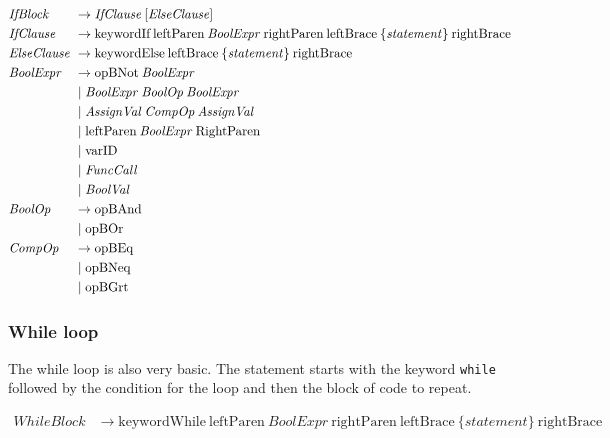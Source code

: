 \begin{align*}
    \omit $\mathit{IfBlock}$ \hfil &\rightarrow \mathit{IfClause} \: [\mathit{ElseClause}] \\
    \omit $\mathit{IfClause}$ \hfil &\rightarrow \text{keywordIf} \: \text{leftParen} \: \mathit{BoolExpr} \: \text{rightParen} \: \text{leftBrace} \: \{ \mathit{statement}\} \: \text{rightBrace} \\
    \omit $\mathit{ElseClause}$ \hfil &\rightarrow \text{keywordElse} \: \text{leftBrace} \: \{ \mathit{statement} \} \: \text{rightBrace} \\
    \omit $\mathit{BoolExpr}$ \hfil &\rightarrow \text{opBNot} \: \mathit{BoolExpr} \\
    & \mid \mathit{BoolExpr} \: \mathit{BoolOp} \: \mathit{BoolExpr} \\
    & \mid \mathit{AssignVal} \: \mathit{CompOp} \: \mathit{AssignVal} \\
    & \mid \text{leftParen} \: \mathit{BoolExpr} \: \text{RightParen} \\
    & \mid \text{varID} \\
    & \mid \mathit{FuncCall} \\
    & \mid \mathit{BoolVal} \\
    \omit $\mathit{BoolOp}$ \hfil &\rightarrow \text{opBAnd} \\
    & \mid \text{opBOr} \\
    \omit $\mathit{CompOp}$ \hfil & \rightarrow \text{opBEq} \\
    & \mid \text{opBNeq} \\
    & \mid \text{opBGrt} \\
\end{align*}

\subsubsection*{While loop}

The while loop is also very basic.
The statement starts with the keyword \texttt{while} followed by the condition for the loop and then the block of code to repeat.

\begin{align*}
\mathit{WhileBlock} &\rightarrow \text{keywordWhile} \: \text{leftParen} \: \mathit{BoolExpr} \: \text{rightParen} \: \text{leftBrace} \: \{ \mathit{statement}\} \: \text{rightBrace} \\
\end{align*}

